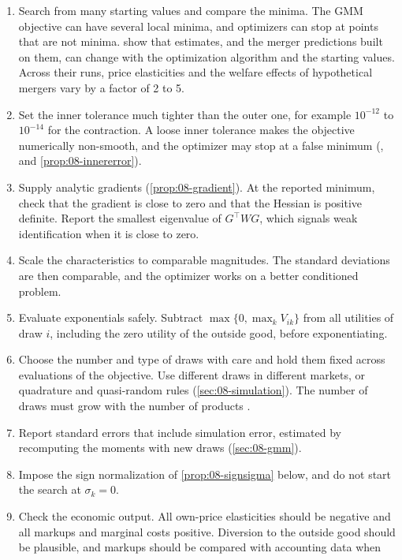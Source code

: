 \begin{enumerate}
  \item Search from many starting values and compare the minima. The GMM objective can have several local minima, and
  optimizers can stop at points that are not minima. \citet[p.~34]{KnittelMetaxoglou2014} show that estimates, and the
  merger predictions built on them, can change with the optimization algorithm and the starting values. Across their
  runs, price elasticities and the welfare effects of hypothetical mergers vary by a factor of 2 to 5.
  \item Set the inner tolerance much tighter than the outer one, for example $10^{-12}$ to $10^{-14}$ for the
  contraction. A loose inner tolerance makes the objective numerically non-smooth, and the optimizer may stop at a false
  minimum (\citealp{DubeFoxSu2012}, and \cref{prop:08-innererror}).
  \item Supply analytic gradients (\cref{prop:08-gradient}). At the reported minimum, check that the gradient is close to
  zero and that the Hessian is positive definite. Report the smallest eigenvalue of $G^\top W G$, which signals weak
  identification when it is close to zero.
  \item Scale the characteristics to comparable magnitudes. The standard deviations are then comparable, and the
  optimizer works on a better conditioned problem.
  \item Evaluate exponentials safely. Subtract $\max\{0, \max_k V_{ik}\}$ from all utilities of draw $i$, including the
  zero utility of the outside good, before exponentiating.
  \item Choose the number and type of draws with care and hold them fixed across evaluations of the objective. Use
  different draws in different markets, or quadrature and quasi-random rules (\cref{sec:08-simulation}). The number of
  draws must grow with the number of products \citep{BerryLintonPakes2004}.
  \item Report standard errors that include simulation error, estimated by recomputing the moments with new draws
  (\cref{sec:08-gmm}).
  \item Impose the sign normalization of \cref{prop:08-signsigma} below, and do not start the search at
  $\sigma_k = 0$.
  \item Check the economic output. All own-price elasticities should be negative and all markups and marginal costs
  positive. Diversion to the outside good should be plausible, and markups should be compared with accounting data when

\end{enumerate}

